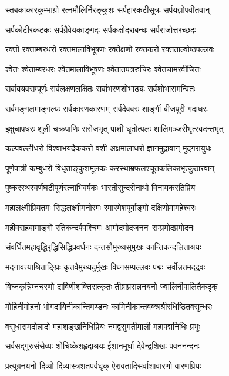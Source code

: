 \twolineshloka
{स्तबकाकारकुम्भाग्रो रत्नमौलिर्निरङ्कुशः}
{सर्पहारकटीसूत्रः सर्पयज्ञोपवीतवान्}

\twolineshloka
{सर्पकोटीरकटकः सर्पग्रैवेयकाङ्गदः}
{सर्पकक्षोदराबन्धः सर्पराजोत्तरच्छदः}

\twolineshloka
{रक्तो रक्ताम्बरधरो रक्तमालाविभूषणः}
{रक्तेक्षणो रक्तकरो रक्तताल्वोष्ठपल्लवः}

\twolineshloka
{श्वेतः श्वेताम्बरधरः श्वेतमालाविभूषणः}
{श्वेतातपत्ररुचिरः श्वेतचामरवीजितः}

\twolineshloka
{सर्वावयवसम्पूर्णः सर्वलक्षणलक्षितः}
{सर्वाभरणशोभाढ्यः सर्वशोभासमन्वितः}

\twolineshloka
{सर्वमङ्गलमाङ्गल्यः सर्वकारणकारणम्}
{सर्वदेववरः शार्ङ्गी बीजपूरी गदाधरः}


\twolineshloka
{इक्षुचापधरः शूली चक्रपाणिः सरोजभृत्}
{पाशी धृतोत्पलः शालिमञ्जरीभृत्स्वदन्तभृत्}

\twolineshloka
{कल्पवल्लीधरो विश्वाभयदैककरो वशी}
{अक्षमालाधरो ज्ञानमुद्रावान् मुद्गरायुधः}

\twolineshloka
{पूर्णपात्री कम्बुधरो विधृताङ्कुशमूलकः}
{करस्थाम्रफलश्चूतकलिकाभृत्कुठारवान्}

\twolineshloka
{पुष्करस्थस्वर्णघटीपूर्णरत्नाभिवर्षकः}
{भारतीसुन्दरीनाथो विनायकरतिप्रियः}

\twolineshloka
{महालक्ष्मीप्रियतमः सिद्धलक्ष्मीमनोरमः}
{रमारमेशपूर्वाङ्गो दक्षिणोमामहेश्वरः}

\twolineshloka
{महीवराहवामाङ्गो रतिकन्दर्पपश्चिमः}
{आमोदमोदजननः सम्प्रमोदप्रमोदनः}

\twolineshloka
{संवर्धितमहावृद्धिरृद्धिसिद्धिप्रवर्धनः}
{दन्तसौमुख्यसुमुखः कान्तिकन्दलिताश्रयः}

\twolineshloka
{मदनावत्याश्रिताङ्घ्रिः कृतवैमुख्यदुर्मुखः}
{विघ्नसम्पल्लवः पद्मः सर्वोन्नतमदद्रवः}

\twolineshloka
{विघ्नकृन्निम्नचरणो द्राविणीशक्तिसत्कृतः}
{तीव्राप्रसन्ननयनो ज्वालिनीपालितैकदृक्}

\twolineshloka
{मोहिनीमोहनो भोगदायिनीकान्तिमण्डनः}
{कामिनीकान्तवक्त्रश्रीरधिष्ठितवसुन्धरः}

\twolineshloka
{वसुधारामदोन्नादो महाशङ्खनिधिप्रियः}
{नमद्वसुमतीमाली महापद्मनिधिः प्रभुः}

\twolineshloka
{सर्वसद्गुरुसंसेव्यः शोचिष्केशहृदाश्रयः}
{ईशानमूर्धा देवेन्द्रशिखः पवननन्दनः}

\twolineshloka
{प्रत्युग्रनयनो दिव्यो दिव्यास्त्रशतपर्वधृक्}
{ऐरावतादिसर्वाशावारणो वारणप्रियः}

